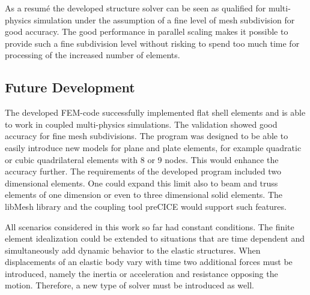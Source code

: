   As a resum\'{e} the developed structure solver can be seen as qualified for multi-physics simulation under the assumption of a fine level of mesh subdivision for good accuracy. The good performance in parallel scaling makes it possible to provide such a fine subdivision level without risking to spend too much time for processing of the increased number of elements.

 \subsection{Future Development}
  The developed FEM-code successfully implemented flat shell elements and is able to work in coupled multi-physics simulations. The validation showed good accuracy for fine mesh subdivisions. The program was designed to be able to easily introduce new models for plane and plate elements, for example quadratic or cubic quadrilateral elements with 8 or 9 nodes. This would enhance the accuracy further. The requirements of the developed program included two dimensional elements. One could expand this limit also to beam and truss elements of one dimension or even to three dimensional solid elements. The libMesh library and the coupling tool preCICE would support such features.
  
  All scenarios considered in this work so far had constant conditions. The finite element idealization could be extended to situations that are time dependent and simultaneously add dynamic behavior to the elastic structures. When displacements of an elastic body vary with time two additional forces must be introduced, namely the inertia or acceleration and resistance opposing the motion. Therefore, a new type of solver must be introduced as well.%
\newpage